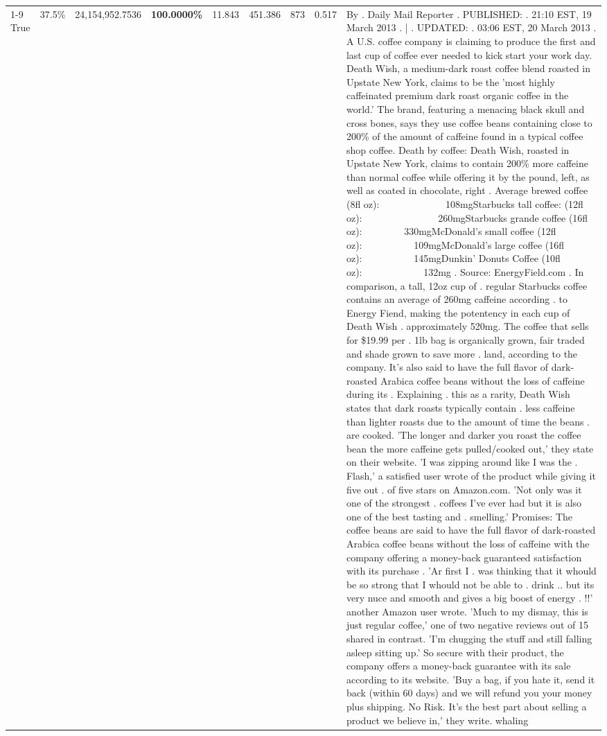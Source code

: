 \begin{table}[H]
{\begin{tabular}{lllrlllll}
\cline{1-9}
True & 37.5\% & 24,154,952.7536 & \bfseries \color{red} 100.0000\% & 11.843 & 451.386 & 873 & 0.517 & By . Daily Mail Reporter . PUBLISHED: . 21:10 EST, 19 March 2013 . | . UPDATED: . 03:06 EST, 20 March 2013 . A U.S. coffee company is claiming to produce the first and last cup of coffee ever needed to kick start your work day. Death Wish, a medium-dark roast coffee blend roasted in Upstate New York, claims to be the 'most highly caffeinated premium dark roast organic coffee in the world.' The brand, featuring a menacing black skull and cross bones, says they use coffee beans containing close to 200\% of the amount of caffeine found in a typical coffee shop coffee. Death by coffee: Death Wish, roasted in Upstate New York, claims to contain 200\% more caffeine than normal coffee while offering it by the pound, left, as well as coated in chocolate, right . Average brewed coffee (8fl oz):              108mgStarbucks tall coffee: (12fl oz):                260mgStarbucks grande coffee (16fl oz):         330mgMcDonald's small coffee (12fl oz):           109mgMcDonald's large coffee (16fl oz):           145mgDunkin' Donuts Coffee (10fl oz):             132mg . Source: EnergyField.com . In comparison, a tall, 12oz cup of . regular Starbucks coffee contains an average of 260mg caffeine according . to Energy Fiend, making the potentency in each cup of Death Wish . approximately 520mg. The coffee that sells for \$19.99 per . 1lb bag is organically grown, fair traded and shade grown to save more . land, according to the company. It's also said to have the full flavor of dark-roasted Arabica coffee beans without the loss of caffeine during its . Explaining . this as a rarity, Death Wish states that dark roasts typically contain . less caffeine than lighter roasts due to the amount of time the beans . are cooked. 'The longer and darker you roast the coffee bean the more caffeine gets pulled/cooked out,' they state on their website. 'I was zipping around like I was the . Flash,' a satisfied user wrote of the product while giving it five out . of five stars on Amazon.com. 'Not only was it one of the strongest . coffees I've ever had but it is also one of the best tasting and . smelling.’ Promises: The coffee beans are said to have the full flavor of dark-roasted Arabica coffee beans without the loss of caffeine with the company offering a money-back guaranteed satisfaction with its purchase . 'Ar first I . was thinking that it whould be so strong that I whould not be able to . drink .. but its very nuce and smooth and gives a big boost of energy . !!' another Amazon user wrote. 'Much to my dismay, this is just regular coffee,' one of two negative reviews out of 15 shared in contrast. 'I'm chugging the stuff and still falling asleep sitting up.' So secure with their product, the company offers a money-back guarantee with its sale according to its website. 'Buy a bag, if you hate it, send it back (within 60 days) and we will refund you your money plus shipping. No Risk. It’s the best part about selling a product we believe in,' they write. whaling \\

\end{tabular}}
\end{table}
